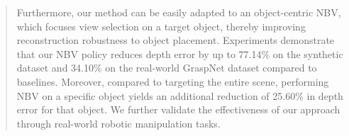 \begin{abstract}
Furthermore, our method can be easily adapted to an object-centric \ac{NBV}, which focuses view selection on a target object, thereby improving reconstruction robustness to object placement.
Experiments demonstrate that our \ac{NBV} policy reduces depth error by up to 77.14\% on the synthetic dataset and 34.10\% on the real-world GraspNet dataset compared to baselines. Moreover, compared to targeting the entire scene, performing \ac{NBV} on a specific object yields an additional reduction of 25.60\% in depth error for that object. We further validate the effectiveness of our approach through real-world robotic manipulation tasks.
\end{abstract}



